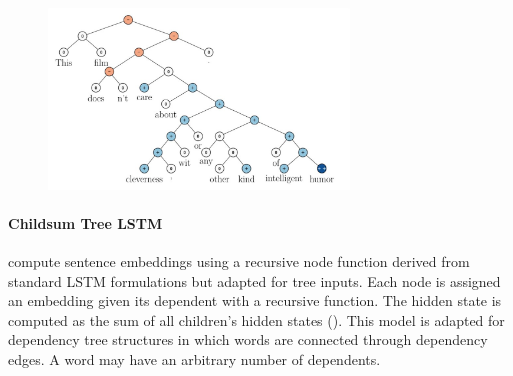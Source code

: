 \begin{figure}[htb!]
    \centering
    \includegraphics[width=8cm]{images/socher-tree-3.png}
    \caption{}
\end{figure}


\paragraph{Childsum Tree LSTM} \textcite{tai_15} compute sentence embeddings using a recursive node function derived from standard LSTM formulations but adapted for tree inputs. Each node is assigned an embedding given its dependent with a recursive function. The hidden state is computed as the sum of all children's hidden states (). This model is adapted for dependency tree structures in which words are connected through dependency edges. A word may have an arbitrary number of dependents.

